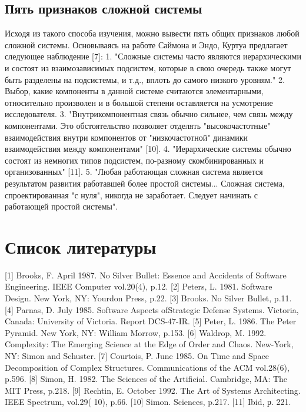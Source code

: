 \documentclass[11pt]{article}
\begin{document}
    	\subsection{Пять признаков сложной системы }
    	Исходя из такого способа изучения, можно вывести пять общих признаков любой сложной системы. Основываясь на работе Саймона и Эндо, Куртуа предлагает следующее наблюдение [7]: 
1. "Сложные системы часто являются иерархическими и состоят из взаимозависимых подсистем, которые в свою очередь также могут быть разделены на подсистемы, и т.д., вплоть до самого низкого уровням." 
2. Выбор, какие компоненты в данной системе считаются элементарными, относительно произволен и в большой степени оставляется на усмотрение исследователя. 
3. "Внутрикомпонентная связь обычно сильнее, чем связь между компонентами. Это обстоятельство позволяет отделять "высокочастотные" взаимодействия внутри компонентов от "низкочастотной" динамики взаимодействия между компонентами" [10]. 
4. "Иерархические системы обычно состоят из немногих типов подсистем, по-разному скомбинированных и организованных" [11]. 
5. "Любая работающая сложная система является результатом развития работавшей более простой системы... Сложная система, спроектированная "с нуля", никогда не заработает. Следует начинать с работающей простой системы". 
    \section*{Список литературы}
    [1] Brooks, F. April 1987. No Silver Bullet: Essence and Accidents of Software Engineering. IEEE Computer vol.20(4), p.12. 
[2] Peters, L. 1981. Software Design. New York, NY: Yourdon Press, p.22. 
[3] Brooks. No Silver Bullet, p.11. 
[4] Parnas, D. July 1985. Software Aspects ofStrategic Defense Systems. Victoria, Canada: University of Victoria. Report DCS-47-IR. 
[5] Peter, L. 1986. The Peter Pyramid. New York, NY: William Morrow, p.153. 
[6] Waldrop, M. 1992. Complexity: The Emerging Science at the Edge of Order and Chaos. New-York, NY: Simon and Schuster. 
[7] Courtois, P. June 1985. On Time and Space Decomposition of Complex Structures. Communications of the ACM vol.28(6), p.596. 
[8] Simon, H. 1982. The Sciences of the Artificial. Cambridge, MA: The MIT Press, p.218. 
[9] Rechtin, E. October 1992. The Art of Systems Architecting. IEEE Spectrum, vol.29( 10), p.66. 
[10] Simon. Sciences, p.217. 
[11] Ibid, р. 221. 
    
\end{document}
